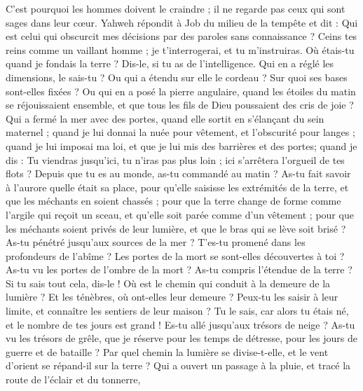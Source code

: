 \begin{multicols}{2}
C'est pourquoi les hommes doivent le craindre ; il ne regarde pas ceux qui sont sages dans leur cœur.
\VerseOne{}Yahweh répondit à Job du milieu de la tempête et dit :
Qui est celui qui obscurcit mes décisions par des paroles sans connaissance ?
Ceins tes reins comme un vaillant homme ; je t'interrogerai, et tu m'instruiras.
Où étais-tu quand je fondais la terre ? Dis-le, si tu as de l'intelligence.
Qui en a réglé les dimensions, le sais-tu ? Ou qui a étendu sur elle le cordeau ?
Sur quoi ses bases sont-elles fixées ? Ou qui en a posé la pierre angulaire,
quand les étoiles du matin se réjouissaient ensemble, et que tous les fils de Dieu poussaient des cris de joie ?
Qui a fermé la mer avec des portes, quand elle sortit en s'élançant du sein maternel ;
quand je lui donnai la nuée pour vêtement, et l'obscurité pour langes ;
quand je lui imposai ma loi, et que je lui mis des barrières et des portes;
quand je dis : Tu viendras jusqu'ici, tu n'iras pas plus loin ; ici s'arrêtera l'orgueil de tes flots ?
Depuis que tu es au monde, as-tu commandé au matin ? As-tu fait savoir à l'aurore quelle était sa place,
pour qu'elle saisisse les extrémités de la terre, et que les méchants en soient chassés ;
pour que la terre change de forme comme l'argile qui reçoit un sceau, et qu'elle soit parée comme d'un vêtement ;
pour que les méchants soient privés de leur lumière, et que le bras qui se lève soit brisé ?
As-tu pénétré jusqu'aux sources de la mer ? T'es-tu promené dans les profondeurs de l'abîme ?
Les portes de la mort se sont-elles découvertes à toi ? As-tu vu les portes de l'ombre de la mort ?
As-tu compris l'étendue de la terre ? Si tu sais tout cela, dis-le !
Où est le chemin qui conduit à la demeure de la lumière ? Et les ténèbres, où ont-elles leur demeure ?
Peux-tu les saisir à leur limite, et connaître les sentiers de leur maison ?
Tu le sais, car alors tu étais né, et le nombre de tes jours est grand !
Es-tu allé jusqu'aux trésors de neige ? As-tu vu les trésors de grêle,
que je réserve pour les temps de détresse, pour les jours de guerre et de bataille ?
Par quel chemin la lumière se divise-t-elle, et le vent d'orient se répand-il sur la terre ?
Qui a ouvert un passage à la pluie, et tracé la route de l'éclair et du tonnerre,

\end{multicols}
